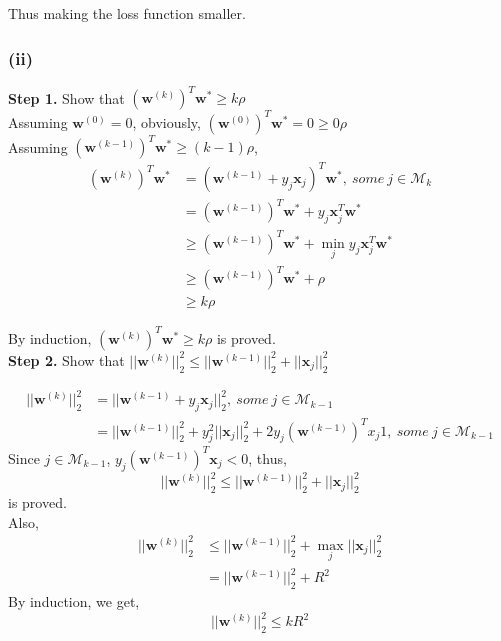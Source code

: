 \documentclass[11pt]{article}
\begin{document}
Thus making the loss function smaller.
\pagebreak
\subsubsection*{(ii)} 
\noindent \textbf{Step 1.} Show that $(\pmb{w}^{(k)})^T\pmb{w}^*\ge k\rho$\\
Assuming $\pmb{w}^{(0)} = 0$, obviously, $(\pmb{w}^{(0)})^T\pmb{w}^* = 0 \ge 0\rho$\\
Assuming $(\pmb{w}^{(k-1)})^T\pmb{w}^*\ge (k-1)\rho$,
\begin{equation}
\begin{split}
(\pmb{w}^{(k)})^T\pmb{w}^* &= (\pmb{w}^{(k-1)} + y_j\pmb{x}_j)^T\pmb{w}^*,\ some\ j\in  \mathcal{M}_k\\
&=(\pmb{w}^{(k-1)})^T\pmb{w}^*+y_j\pmb{x}_j^T\pmb{w}^*\\
&\ge (\pmb{w}^{(k-1)})^T\pmb{w}^*+\min_j y_j\pmb{x}_j^T\pmb{w}^*\\
&\ge (\pmb{w}^{(k-1)})^T\pmb{w}^*+\rho\\
&\ge k\rho
\end{split}
\end{equation}

\noindent By induction, $(\pmb{w}^{(k)})^T\pmb{w}^*\ge k\rho$ is proved.\\
\noindent \textbf{Step 2.} Show that $||\pmb{w}^{(k)}||^2_2 \le ||\pmb{w}^{(k-1)}||^2_2+||\pmb{x}_j||^2_2$

\begin{equation}
\begin{split}
||\pmb{w}^{(k)}||^2_2 &= ||\pmb{w}^{(k-1)} + y_j\pmb{x}_j||^2_2,\ some\ j\in\mathcal{M}_{k-1}\\
&=||\pmb{w}^{(k-1)}||^2_2+y_j^2||\pmb{x}_j||^2_2+2y_j(\pmb{w}^{(k-1)})^Tx_j1,\ some\ j\in\mathcal{M}_{k-1}
\end{split}
\end{equation}
Since $j \in \mathcal{M}_{k-1}$, $y_j(\pmb{w}^{(k-1)})^T\pmb{x}_j < 0$, thus,
$$||\pmb{w}^{(k)}||^2_2 \le ||\pmb{w}^{(k-1)}||^2_2+||\pmb{x}_j||^2_2$$
is proved.\\
Also, 
\begin{equation}
\begin{split}
||\pmb{w}^{(k)}||^2_2 &\le ||\pmb{w}^{(k-1)}||^2_2+\max_j||\pmb{x}_j||^2_2\\
&=||\pmb{w}^{(k-1)}||^2_2+R^2
\end{split}
\end{equation}
By induction, we get,
$$||\pmb{w}^{(k)}||^2_2 \le kR^2$$
\end{document}

